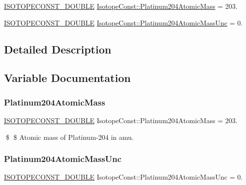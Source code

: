\begin{DoxyCompactItemize}
\item 
\mbox{\hyperlink{group___isotope_const-_macros_ga8f45a7272ce02c0b4c65c44636ed719a}{I\+S\+O\+T\+O\+P\+E\+C\+O\+N\+S\+T\+\_\+\+D\+O\+U\+B\+LE}} \mbox{\hyperlink{group___isotope_const-_platinum-_pt204_gad4543f4541faaa9a09937b7e5d02f95d}{Isotope\+Const\+::\+Platinum204\+Atomic\+Mass}} = 203.
\item 
\mbox{\hyperlink{group___isotope_const-_macros_ga8f45a7272ce02c0b4c65c44636ed719a}{I\+S\+O\+T\+O\+P\+E\+C\+O\+N\+S\+T\+\_\+\+D\+O\+U\+B\+LE}} \mbox{\hyperlink{group___isotope_const-_platinum-_pt204_ga3c2b8730ea4d4975756ffda7f6da13d9}{Isotope\+Const\+::\+Platinum204\+Atomic\+Mass\+Unc}} = 0.
\end{DoxyCompactItemize}


\subsection{Detailed Description}


\subsection{Variable Documentation}
\mbox{\label{group___isotope_const-_platinum-_pt204_gad4543f4541faaa9a09937b7e5d02f95d}} 
\subsubsection{\texorpdfstring{Platinum204\+Atomic\+Mass}{Platinum204AtomicMass}}
{\footnotesize\ttfamily \mbox{\hyperlink{group___isotope_const-_macros_ga8f45a7272ce02c0b4c65c44636ed719a}{I\+S\+O\+T\+O\+P\+E\+C\+O\+N\+S\+T\+\_\+\+D\+O\+U\+B\+LE}} Isotope\+Const\+::\+Platinum204\+Atomic\+Mass = 203.}

\$ \$ Atomic mass of Platinum-\/204 in amu. \mbox{\label{group___isotope_const-_platinum-_pt204_ga3c2b8730ea4d4975756ffda7f6da13d9}} 
\subsubsection{\texorpdfstring{Platinum204\+Atomic\+Mass\+Unc}{Platinum204AtomicMassUnc}}
{\footnotesize\ttfamily \mbox{\hyperlink{group___isotope_const-_macros_ga8f45a7272ce02c0b4c65c44636ed719a}{I\+S\+O\+T\+O\+P\+E\+C\+O\+N\+S\+T\+\_\+\+D\+O\+U\+B\+LE}} Isotope\+Const\+::\+Platinum204\+Atomic\+Mass\+Unc = 0.}

